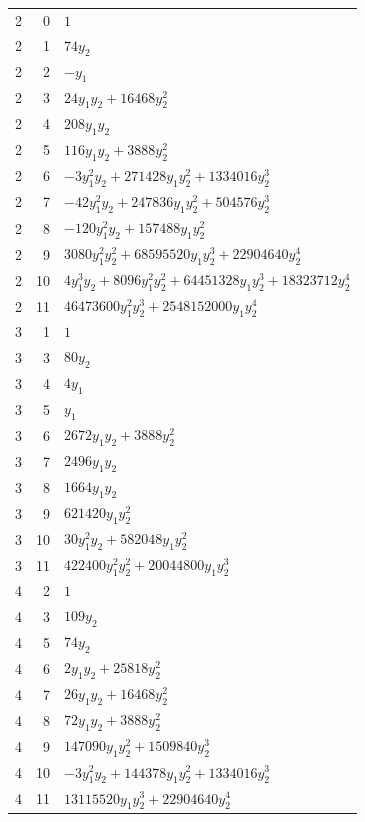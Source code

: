 \documentclass[10pt,a4paper]{article}
\begin{document}
{\begin{longtable}{rrp{125mm}}
2 & 0 & $1$\\
2 & 1 & $74 y_{2}$\\
2 & 2 & $- y_{1}$\\
2 & 3 & $24 y_{1} y_{2} + 16468 y_{2}^{2}$\\
2 & 4 & $208 y_{1} y_{2}$\\
2 & 5 & $116 y_{1} y_{2} + 3888 y_{2}^{2}$\\
2 & 6 & $- 3 y_{1}^{2} y_{2} + 271428 y_{1} y_{2}^{2} + 1334016 y_{2}^{3}$\\
2 & 7 & $- 42 y_{1}^{2} y_{2} + 247836 y_{1} y_{2}^{2} + 504576 y_{2}^{3}$\\
2 & 8 & $- 120 y_{1}^{2} y_{2} + 157488 y_{1} y_{2}^{2}$\\
2 & 9 & $3080 y_{1}^{2} y_{2}^{2} + 68595520 y_{1} y_{2}^{3} + 22904640 y_{2}^{4}$\\
2 & 10 & $4 y_{1}^{3} y_{2} + 8096 y_{1}^{2} y_{2}^{2} + 64451328 y_{1} y_{2}^{3} + 18323712 y_{2}^{4}$\\
2 & 11 & $46473600 y_{1}^{2} y_{2}^{3} + 2548152000 y_{1} y_{2}^{4}$\\
3 & 1 & $1$\\
3 & 3 & $80 y_{2}$\\
3 & 4 & $4 y_{1}$\\
3 & 5 & $y_{1}$\\
3 & 6 & $2672 y_{1} y_{2} + 3888 y_{2}^{2}$\\
3 & 7 & $2496 y_{1} y_{2}$\\
3 & 8 & $1664 y_{1} y_{2}$\\
3 & 9 & $621420 y_{1} y_{2}^{2}$\\
3 & 10 & $30 y_{1}^{2} y_{2} + 582048 y_{1} y_{2}^{2}$\\
3 & 11 & $422400 y_{1}^{2} y_{2}^{2} + 20044800 y_{1} y_{2}^{3}$\\
4 & 2 & $1$\\
4 & 3 & $109 y_{2}$\\
4 & 5 & $74 y_{2}$\\
4 & 6 & $2 y_{1} y_{2} + 25818 y_{2}^{2}$\\
4 & 7 & $26 y_{1} y_{2} + 16468 y_{2}^{2}$\\
4 & 8 & $72 y_{1} y_{2} + 3888 y_{2}^{2}$\\
4 & 9 & $147090 y_{1} y_{2}^{2} + 1509840 y_{2}^{3}$\\
4 & 10 & $- 3 y_{1}^{2} y_{2} + 144378 y_{1} y_{2}^{2} + 1334016 y_{2}^{3}$\\
4 & 11 & $13115520 y_{1} y_{2}^{3} + 22904640 y_{2}^{4}$\\

\end{longtable}}
\end{document}
